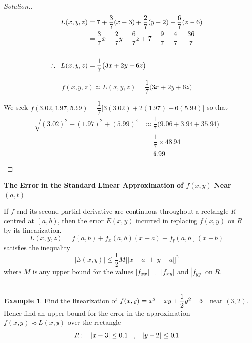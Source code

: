 \documentclass[11pt,a4paper]{article}
\theoremstyle{definition}
\newtheorem{exa}[thm]{Example}
\newenvironment{solution}
  {\renewcommand{\qedsymbol}{}\begin{proof}[\textit{Solution}.]}
  {\end{proof}}
\newcommand{\subhead}[1]{%
  \par\medskip\noindent\textbf{#1}\par\nobreak\smallskip}
\begin{document}
\begin{solution}
\begin{align*}
L(x,y,z) & = 7 + \dfrac{3}{7}(x - 3) + \dfrac{2}{7}(y - 2) + \dfrac{6}{7}(z - 6)\\
& = \dfrac{3}{7}x + \dfrac{2}{7}y + \dfrac{6}{7}z + 7 - \frac{9}{7} - \frac{4}{7} - \frac{36}{7}\\\\
\therefore \hspace{0.2cm} L(x,y,z) & = \dfrac{1}{7}\big(3x + 2y + 6z\big)
\end{align*}

$$f(x,y,z) \approx L(x,y,z) = \dfrac{1}{7}\big(3x + 2y + 6z\big)$$

We seek $\displaystyle{f(3.02,1.97,5.99) = \dfrac{1}{7}\Big[3(3.02) + 2(1.97) + 6(5.99)\Big]}$ so that
\begin{align*}
\sqrt{(3.02)^2 + (1.97)^2 + (5.99)^2} & \approx \dfrac{1}{7}\Big(9.06 + 3.94 + 35.94\Big)\\
& = \dfrac{1}{7}\times 48.94\\
& = 6.99\\\\
\end{align*}
\end{solution}

\subhead{The Error in the Standard Linear Approximation of $f(x,y)$ Near $(a,b)$}
If $f$ and its second partial derivative are continuous throughout a rectangle $R$ centred at $(a,b)$, then the error $E(x,y)$ incurred in replacing $f(x,y)$ on $R$ by its linearization.
$$L(x,y,z) = f(a,b) + f_x (a,b)(x - a) + f_y (a,b)(x - b) $$
satisfies the inequality $$\left|E(x,y)\right| \leq \dfrac{1}{2}M\Big[\left|x - a\right| + \left|y - a\right|\Big]^2$$ where $M$ is any upper bound for the values $\left|f_{xx}\right|\hspace{0.2cm} , \hspace{0.2cm} \left|f_{xy}\right|$ and $\left|f_{yy}\right|$ on $R$.\\\\

\begin{exa}


Find the linearization of $f(x,y) = x^2 - xy + \dfrac{1}{2}y^2 + 3\hspace{0.2cm}$ near $(3,2)$. Hence find an upper bound for the error in the approximation $f(x,y) \approx L(x,y)$ over the rectangle $$R:\hspace{0.3cm} \left|x - 3\right| \leq  0.1\hspace{0.3cm} , \hspace{0.3cm} \left|y - 2\right|\leq 0.1$$
\end{exa}
\end{document}
